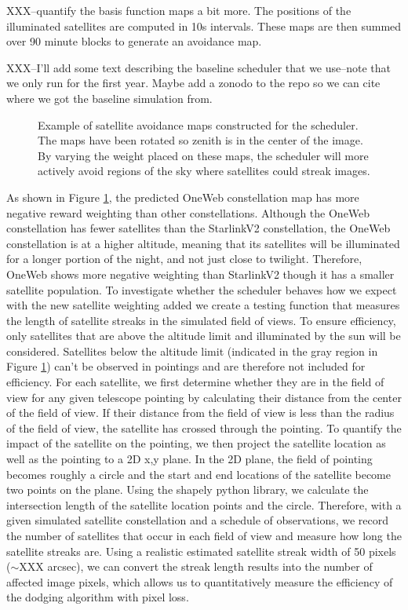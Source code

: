 \documentclass[linenumbers]{aastex631}
\begin{document}
XXX--quantify the basis function maps a bit more. The positions of the illuminated satellites are computed in 10s intervals. These maps are then summed over 90 minute blocks to generate an avoidance map. 

XXX--I'll add some text describing the baseline scheduler that we use--note that we only run for the first year. Maybe add a zonodo to the repo so we can cite where we got the baseline simulation from.

\begin{figure}[ht!]
\caption{Example of satellite avoidance maps constructed for the scheduler. The maps have been rotated so zenith is in the center of the image. By varying the weight placed on these maps, the scheduler will more actively avoid regions of the sky where satellites could streak images. \label{fig-simulated-scheduler}}
\end{figure}

As shown in Figure \ref{fig-simulated-scheduler}, the predicted OneWeb constellation map has more negative reward
weighting than other constellations. Although the OneWeb constellation has fewer satellites than
the StarlinkV2 constellation, the OneWeb constellation is at a higher altitude, meaning that its
satellites will be illuminated for a longer portion of the night, and not just close to twilight.
Therefore, OneWeb shows more negative weighting than StarlinkV2 though it has a smaller
satellite population.
To investigate whether the scheduler behaves how we expect with the new satellite
weighting added we create a testing function that measures the length of satellite streaks in the
simulated field of views. To ensure efficiency, only satellites that are above the altitude limit and
illuminated by the sun will be considered. Satellites below the altitude limit (indicated in the gray
region in Figure \ref{fig-simulated-scheduler}) can’t be observed in pointings and are therefore not included for efficiency.
For each satellite, we first determine whether they are in the field of view for any given
telescope pointing by calculating their distance from the center of the field of view. If their
distance from the field of view is less than the radius of the field of view, the satellite has crossed
through the pointing. To quantify the impact of the satellite on the pointing, we then project the satellite location as well as the pointing to a 2D x,y plane. In the 2D plane, the field of pointing
becomes roughly a circle and the start and end locations of the satellite become two points on the
plane. Using the shapely python library, we calculate the intersection length of the satellite location
points and the circle.
Therefore, with a given simulated satellite constellation and a schedule of observations,
we record the number of satellites that occur in each field of view and measure how long the
satellite streaks are. Using a realistic estimated satellite streak width of 50 pixels ($\sim$XXX arcsec), we can convert
the streak length results into the number of affected image pixels, which allows us to
quantitatively measure the efficiency of the dodging algorithm with pixel loss. 
\end{document}

